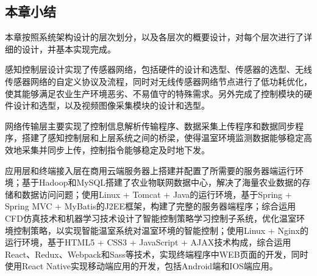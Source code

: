 	\subsection{本章小结}
本章按照系统架构设计的层次划分，以及各层次的概要设计，对每个层次进行了详细的设计，并基本实现完成。

感知控制层设计实现了传感器网络，包括硬件的设计和选型、传感器的选型、无线传感器网络的自定义协议及流程，同时对无线传感器网络节点进行了低功耗优化，使其能够满足农业生产环境恶劣、不易值守的特殊需求。另外完成了控制模块的硬件设计和选型，以及视频图像采集模块的设计和选型。

网络传输层主要实现了控制信息解析传输程序、数据采集上传程序和数据同步程序，搭建了感知控制层和上层系统之间的桥梁，使得温室环境监测数据能够稳定高效地采集并同步上传，控制指令能够稳定及时地下发。

应用层和终端接入层在商用云端服务器上搭建并配置了所需要的服务器端运行环境；基于Hadoop和MySQL搭建了农业物联网数据中心，解决了海量农业数据的存储和数据访问问题；使用Linux + Tomcat + Java的运行环境，基于Spring + Spring MVC + MyBatis的J2EE框架，构建了完整的服务器端程序；综合运用CFD仿真技术和机器学习技术设计了智能控制策略学习控制子系统，优化温室环境控制策略，以实现智能温室系统对温室环境的智能控制；使用Linux + Nginx的运行环境，基于HTML5 + CSS3 + JavaScript + AJAX技术构成，综合运用React、Redux、Webpack和Sass等技术，实现终端程序中WEB页面的开发，同时使用React Native实现移动端应用的开发，包括Android端和IOS端应用。

